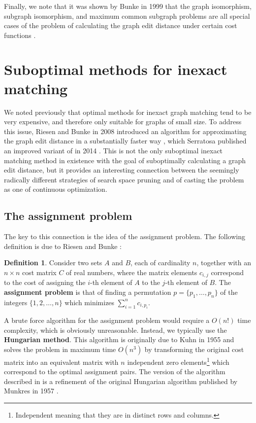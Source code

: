 \documentclass[12pt]{thesis}
\theoremstyle{plain}
\theoremstyle{definition}
\newtheorem{definition}[theorem]{Definition}
\theoremstyle{remark}
\begin{document}
Finally, we note that it was shown by Bunke in 1999 that the graph isomorphism, subgraph isomorphism, and maximum common subgraph problems are all special cases of the problem of calculating the graph edit distance under certain cost functions \cite{Bunke_1999}. 

\section{Suboptimal methods for inexact matching}

We noted previously that optimal methods for inexact graph matching tend to be very expensive, and therefore only suitable for graphs of small size. To address this issue, Riesen and Bunke in 2008 introduced an algorithm for approximating the graph edit distance in a substantially faster way \cite{Riesen_2009}, which Serratosa published an improved variant of in 2014 \cite{Serratosa_2014}. This is not the only suboptimal inexact matching method in existence with the goal of suboptimally calculating a graph edit distance, but it provides an interesting connection between the seemingly radically different strategies of search space pruning and of casting the problem as one of continuous optimization.

\subsection{The assignment problem}

The key to this connection is the idea of the assignment problem. The following definition is due to Riesen and Bunke \cite{Riesen_2009}:

\begin{definition}
Consider two sets $A$ and $B$, each of cardinality $n$, together with an $n\times n$ cost matrix $C$ of real numbers, where the matrix elements $c_{i,j}$ correspond to the cost of assigning the $i$-th element of $A$ to the $j$-th element of $B$. The \textbf{assignment problem} is that of finding a permutation $p=\{p_1,\dots,p_n\}$ of the integers $\{1,2,\dots,n\}$ which minimizes $\sum_{i=1}^n c_{i,p_i}$.
\end{definition}

A brute force algorithm for the assignment problem would require a $O(n!)$ time complexity, which is obviously unreasonable. Instead, we typically use the \textbf{Hungarian method}. This algorithm is originally due to Kuhn in 1955 \cite{Kuhn_1955} and solves the problem in maximum time $O(n^3)$ by transforming the original cost matrix into an equivalent matrix with $n$ independent zero elements\footnote{Independent meaning that they are in distinct rows and columns.} which correspond to the optimal assignment pairs. The version of the algorithm described in \cite{Riesen_2009} is a refinement of the original Hungarian algorithm published by Munkres in 1957 \cite{munkres1957algorithms}.
\end{document}
